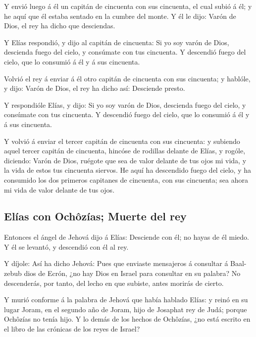  Y envió luego á él un capitán de cincuenta con sus
cincuenta, el cual subió á él; y he aquí que él estaba sentado en la
cumbre del monte. Y él le dijo: Varón de Dios, el rey ha dicho que
desciendas.

 Y Elías respondió, y dijo al capitán de cincuenta: Si yo
soy varón de Dios, descienda fuego del cielo, y consúmate con tus
cincuenta. Y descendió fuego del cielo, que lo consumió á él y á sus
cincuenta.

 Volvió el rey á enviar á él otro capitán de cincuenta
con sus cincuenta; y hablóle, y dijo: Varón de Dios, el rey ha dicho
así: Desciende presto.

 Y respondióle Elías, y dijo: Si yo soy varón de Dios,
descienda fuego del cielo, y consúmate con tus cincuenta. Y descendió
fuego del cielo, que lo consumió á él y á sus cincuenta.

 Y volvió á enviar el tercer capitán de cincuenta con sus
cincuenta: y subiendo aquel tercer capitán de cincuenta, hincóse de
rodillas delante de Elías, y rogóle, diciendo: Varón de Dios, ruégote
que sea de valor delante de tus ojos mi vida, y la vida de estos tus
cincuenta siervos.  He aquí ha descendido fuego del
cielo, y ha consumido los dos primeros capitanes de cincuenta, con sus
cincuenta; sea ahora mi vida de valor delante de tus ojos.

\hypertarget{eluxedas-con-ochuxf4zuxedas-muerte-del-rey}{%
\subsection{Elías con Ochôzías; Muerte del
rey}\label{eluxedas-con-ochuxf4zuxedas-muerte-del-rey}}

 Entonces el ángel de Jehová dijo á Elías: Desciende con
él; no hayas de él miedo. Y él se levantó, y descendió con él al rey.

 Y díjole: Así ha dicho Jehová: Pues que enviaste
mensajeros á consultar á Baal-zebub dios de Ecrón, ¿no hay Dios en
Israel para consultar en su palabra? No descenderás, por tanto, del
lecho en que subiste, antes morirás de cierto.

 Y murió conforme á la palabra de Jehová que había
hablado Elías: y reinó en su lugar Joram, en el segundo año de Joram,
hijo de Josaphat rey de Judá; porque Ochôzías no tenía hijo.
 Y lo demás de los hechos de Ochôzías, ¿no está escrito
en el libro de las crónicas de los reyes de Israel?

